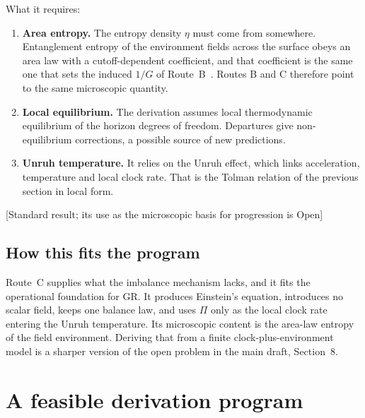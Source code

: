 \documentclass[11pt]{article}
\newcommand{\Pg}{\Pi}
\newcommand{\st}[1]{\textsf{\small[#1]}}
\theoremstyle{plain}
\theoremstyle{remark}
\begin{document}
What it requires:
\begin{enumerate}[R1.]
\item \textbf{Area entropy.} The entropy density $\eta$ must come from somewhere. Entanglement entropy of the environment fields across the surface obeys an area law with a cutoff-dependent coefficient, and that coefficient is the same one that sets the induced $1/G$ of Route~B~\cite{Jacobson1994}. Routes B and C therefore point to the same microscopic quantity.
\item \textbf{Local equilibrium.} The derivation assumes local thermodynamic equilibrium of the horizon degrees of freedom. Departures give non-equilibrium corrections, a possible source of new predictions.
\item \textbf{Unruh temperature.} It relies on the Unruh effect, which links acceleration, temperature and local clock rate. That is the Tolman relation of the previous section in local form.
\end{enumerate}
\st{Standard result; its use as the microscopic basis for progression is Open}

\subsection{How this fits the program}

Route~C supplies what the imbalance mechanism lacks, and it fits the operational foundation for GR. It produces Einstein's equation, introduces no scalar field, keeps one balance law, and uses $\Pg$ only as the local clock rate entering the Unruh temperature. Its microscopic content is the area-law entropy of the field environment. Deriving that from a finite clock-plus-environment model is a sharper version of the open problem in the main draft, Section~8.

\section{A feasible derivation program}
\end{document}
